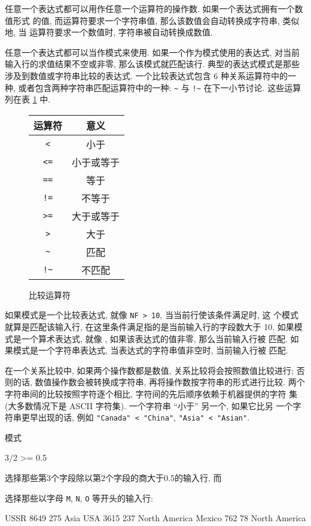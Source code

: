任意一个表达式都可以用作任意一个运算符的操作数.
如果一个表达式拥有一个数值形式%
%
的值, 而运算符要求一个字符串值, 那么该数值会自动转换成字符串, 类似地, 当
运算符要求一个数值时, 字符串被自动转换成数值.

任意一个表达式都可以当作模式来使用. 如果一个作为模式使用的表达式, 对当前
输入行的求值结果不空或非零, 那么该模式就匹配该行. 典型的表达式模式是那些
涉及到数值或字符串比较的表达式. 一个比较表达式包含 6 种关系运算符中的一种,
或者包含两种字符串匹配运算符中的一种: \verb'~' 与 \verb'!~' 在下一小节讨论.
这些运算列在表 \ref{tbl:comparison_operators} 中.
\begin{figure}[ht]
\captionsetup{type=table}
\caption{比较运算符}
\label{tbl:comparison_operators}
\begin{center}
\begin{tabular}{c|c}
    \hline
    \hline
    运算符      & 意义 \\
    \hline
    \verb'<'    & 小于 \\
    \verb'<='   & 小于或等于 \\
    \verb'=='   & 等于  \\
    \verb'!='   & 不等于 \\
    \verb'>='   & 大于或等于 \\
    \verb'>'    & 大于  \\
    \verb'~'    & 匹配 \\
    \verb'!~'   & 不匹配 \\
    \hline
\end{tabular}
\end{center}
\end{figure}

如果模式是一个比较表达式, 就像 \verb'NF > 10', 当当前行使该条件满足时, 这
个模式就算是匹配该输入行, 在这里条件满足指的是当前输入行的字段数大于 10.
如果模式是一个算术表达式, 就像 \nf, 如果该表达式的值非零, 那么当前输入行被
匹配. 如果模式是一个字符串表达式, 当表达式的字符串值非空时, 当前输入行被
匹配.

在一个关系比较中, 如果两个操作数都是数值, 关系比较将会按照数值比较进行;
否则的话, 数值操作数会被转换成字符串, 再将操作数按字符串的形式进行比较.
两个字符串间的比较按照字符逐个相比, 字符间的先后顺序依赖于机器提供的字符
集 (大多数情况下是 ASCII 字符集). 一个字符串 ``小于'' 另一个, 如果它比另
一个字符串更早出现的话, 例如 \verb'"Canada" < "China"',
\verb'"Asia" < "Asian"'.

模式
\begin{awkcode}
    $3/$2 >= 0.5
\end{awkcode}
选择那些第3个字段除以第2个字段的商大于0.5的输入行, 而
选择那些以字母 \verb'M', \verb'N', \verb'O' 等开头的输入行:
\begin{file}
    USSR	8649	275	Asia
    USA	3615	237	North America
    Mexico	762	78	North America
\end{file}

